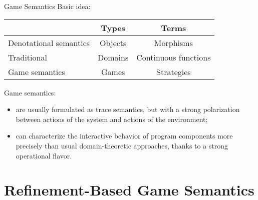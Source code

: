 \documentclass{beamer}
\begin{document}

\begin{frame}{Game Semantics} %
Basic idea:
\begin{center}
  \begin{tabular}{lcc}
  \hline
   & Types & Terms \\
  \hline
  Denotational semantics & Objects & Morphisms \\
  \hspace{1em} Traditional & Domains & Continuous functions \\
  \hspace{1em} Game semantics & Games & Strategies \\
  \hline
  \end{tabular}
\end{center}

\vfill
Game semantics:
\begin{itemize}
\item
  are usually formulated as trace semantics,
  but with a strong polarization between actions
  of the system and actions of the environment;
\item
  can characterize
  the interactive behavior of program components
  more precisely than
  usual domain-theoretic approaches,
  thanks to a strong operational flavor.
\end{itemize}
\vfill
\end{frame}

\section{Refinement-Based Game Semantics}
\end{document}
